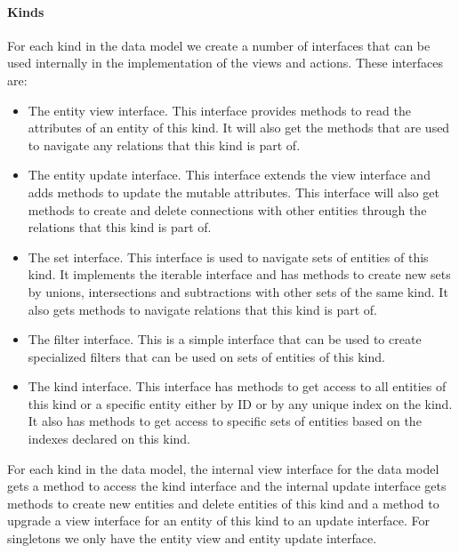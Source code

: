 \paragraph{Kinds}

For each kind in the data model we create a number of interfaces that
can be used internally in the implementation of the views and actions.
These interfaces are:
\begin{itemize}
\item The entity view interface. This interface provides methods to read
the attributes of an entity of this kind. It will also get the methods
that are used to navigate any relations that this kind is part of.
\item The entity update interface. This interface extends the view interface
and adds methods to update the mutable attributes. This interface
will also get methods to create and delete connections with other
entities through the relations that this kind is part of.
\item The set interface. This interface is used to navigate sets of entities
of this kind. It implements the iterable interface and has methods
to create new sets by unions, intersections and subtractions with
other sets of the same kind. It also gets methods to navigate relations
that this kind is part of.
\item The filter interface. This is a simple interface that can be used
to create specialized filters that can be used on sets of entities
of this kind.
\item The kind interface. This interface has methods to get access to all
entities of this kind or a specific entity either by ID or by any
unique index on the kind. It also has methods to get access to specific
sets of entities based on the indexes declared on this kind.
\end{itemize}
For each kind in the data model, the internal view interface for the
data model gets a method to access the kind interface and the internal
update interface gets methods to create new entities and delete entities
of this kind and a method to upgrade a view interface for an entity
of this kind to an update interface. For singletons we only have the
entity view and entity update interface.

